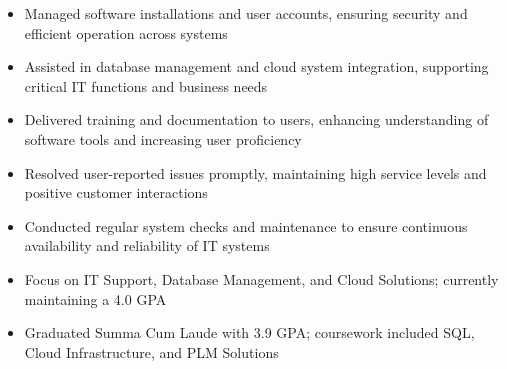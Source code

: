 \par\smallskip
\noindent
\begin{minipage}{20cm}
  \begin{minipage}{9.75cm}
    \begin{itemize}
      \item Managed software installations and user accounts, ensuring security and efficient operation across systems
      \item Assisted in database management and cloud system integration, supporting critical IT functions and business needs
      \item Delivered training and documentation to users, enhancing understanding of software tools and increasing user proficiency
    \end{itemize}
  \end{minipage}
  \hfill
  \begin{minipage}{9.75cm}
    \begin{itemize}
      \item Resolved user-reported issues promptly, maintaining high service levels and positive customer interactions
      \item Conducted regular system checks and maintenance to ensure continuous availability and reliability of IT systems
    \end{itemize}
  \end{minipage}
\end{minipage}

\begin{itemize}
  \item Focus on IT Support, Database Management, and Cloud Solutions; currently maintaining a 4.0 GPA
\end{itemize}
\divider

\begin{itemize}
  \item Graduated Summa Cum Laude with 3.9 GPA; coursework included SQL, Cloud Infrastructure, and PLM Solutions
\end{itemize}

\noindent
\begin{minipage}{20cm}
     
     
    
\end{minipage}


